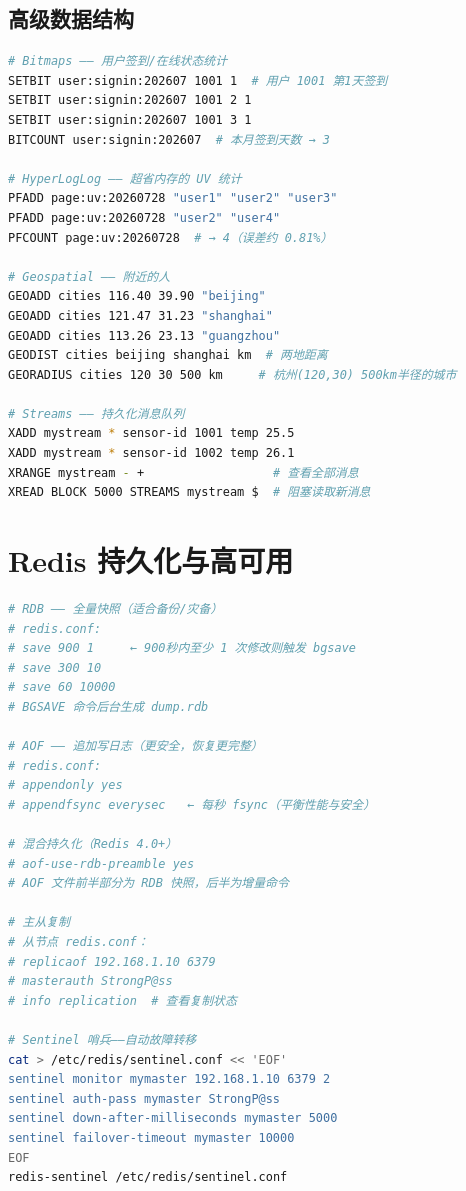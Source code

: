 \documentclass[12pt,UTF8]{ctexbook}
\begin{document}
\subsection{高级数据结构}

\begin{lstlisting}[language=bash]
# Bitmaps —— 用户签到/在线状态统计
SETBIT user:signin:202607 1001 1  # 用户 1001 第1天签到
SETBIT user:signin:202607 1001 2 1
SETBIT user:signin:202607 1001 3 1
BITCOUNT user:signin:202607  # 本月签到天数 → 3

# HyperLogLog —— 超省内存的 UV 统计
PFADD page:uv:20260728 "user1" "user2" "user3"
PFADD page:uv:20260728 "user2" "user4"
PFCOUNT page:uv:20260728  # → 4（误差约 0.81%）

# Geospatial —— 附近的人
GEOADD cities 116.40 39.90 "beijing"
GEOADD cities 121.47 31.23 "shanghai"
GEOADD cities 113.26 23.13 "guangzhou"
GEODIST cities beijing shanghai km  # 两地距离
GEORADIUS cities 120 30 500 km     # 杭州(120,30) 500km半径的城市

# Streams —— 持久化消息队列
XADD mystream * sensor-id 1001 temp 25.5
XADD mystream * sensor-id 1002 temp 26.1
XRANGE mystream - +                  # 查看全部消息
XREAD BLOCK 5000 STREAMS mystream $  # 阻塞读取新消息
\end{lstlisting}

\section{Redis 持久化与高可用}

\begin{lstlisting}[language=bash]
# RDB —— 全量快照（适合备份/灾备）
# redis.conf:
# save 900 1     ← 900秒内至少 1 次修改则触发 bgsave
# save 300 10
# save 60 10000
# BGSAVE 命令后台生成 dump.rdb

# AOF —— 追加写日志（更安全，恢复更完整）
# redis.conf:
# appendonly yes
# appendfsync everysec   ← 每秒 fsync（平衡性能与安全）

# 混合持久化（Redis 4.0+）
# aof-use-rdb-preamble yes
# AOF 文件前半部分为 RDB 快照，后半为增量命令

# 主从复制
# 从节点 redis.conf：
# replicaof 192.168.1.10 6379
# masterauth StrongP@ss
# info replication  # 查看复制状态

# Sentinel 哨兵——自动故障转移
cat > /etc/redis/sentinel.conf << 'EOF'
sentinel monitor mymaster 192.168.1.10 6379 2
sentinel auth-pass mymaster StrongP@ss
sentinel down-after-milliseconds mymaster 5000
sentinel failover-timeout mymaster 10000
EOF
redis-sentinel /etc/redis/sentinel.conf
\end{lstlisting}
\end{document}
